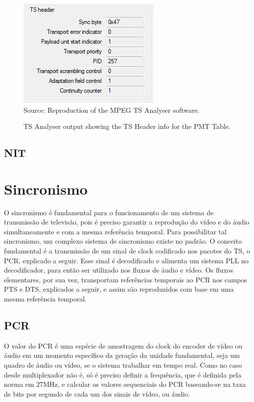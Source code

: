 \documentclass[
	12pt,				%
	openright,			%
	twoside,			%
	a4paper,			%
	brazil,
	french,				%
	english
	]{abntex2}
\begin{document}
\begin{figure}[!hb]
\centering
\caption{TS Analyser output showing the TS Header info for the PMT Table.}
\includegraphics[width=0.4\linewidth]{figuras/TSAnalyser_close_PMT_TS_Header.png}
\\Source: Reproduction of the MPEG TS Analyser software.
\label{fig:TSAnalyser_close_PMT_TS_Header}
\end{figure}

\subsection{NIT}

\section{Sincronismo}

O sincronismo é fundamental para o funcionamento de um sistema de transmissão de televisão, pois é
preciso garantir a reprodução do vídeo e do áudio simultaneamente e com a mesma referência temporal.
Para possibilitar tal sincronismo, um complexo sistema de sincronismo existe no padrão. O conceito
fundamental é a transmissão de um sinal de clock codificado nos pacotes do TS, o PCR, explicado a seguir.
Esse sinal é decodificado
e alimenta um sistema PLL no decodificador, para então ser utilizado nos fluxos de áudio e vídeo.
Os fluxos elementares, por sua vez, transportam referências temporais ao PCR nos campos PTS e DTS, explicados
a seguir, e assim são reproduzidos com base em uma mesma referência temporal.

\subsection{PCR}
O valor do PCR é uma espécie de amostragem do clock do encoder de vídeo ou áudio em um momento específico
da geração da unidade fundamental, seja um quadro de áudio ou vídeo, se o sistema trabalhar em tempo real.
Como no caso desde multiplexador não é, só é preciso definir
a frequência, que é definida pela norma em 27MHz, e calcular os valores sequenciais do PCR baseando-se 
na taxa de bits por segundo de cada um dos sinais de vídeo, ou áudio.
\end{document}
